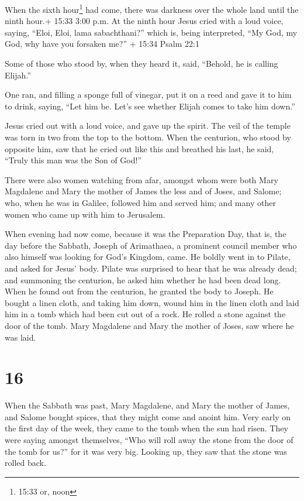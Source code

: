 When the sixth hour\footnote{15:33 or, noon} had come,
there was darkness over the whole land until the ninth hour.+ 15:33 3:00
p.m.  At the ninth hour Jesus cried with a loud voice,
saying, ``Eloi, Eloi, lama sabachthani?'' which is, being interpreted,
``My God, my God, why have you forsaken me?'' + 15:34 Psalm 22:1

 Some of those who stood by, when they heard it, said,
``Behold, he is calling Elijah.''

 One ran, and filling a sponge full of vinegar, put it on a
reed and gave it to him to drink, saying, ``Let him be. Let's see
whether Elijah comes to take him down.''

 Jesus cried out with a loud voice, and gave up the spirit.
 The veil of the temple was torn in two from the top to the
bottom.  When the centurion, who stood by opposite him, saw
that he cried out like this and breathed his last, he said, ``Truly this
man was the Son of God!''

 There were also women watching from afar, amongst whom
were both Mary Magdalene and Mary the mother of James the less and of
Joses, and Salome;  who, when he was in Galilee, followed
him and served him; and many other women who came up with him to
Jerusalem.

 When evening had now come, because it was the Preparation
Day, that is, the day before the Sabbath,  Joseph of
Arimathaea, a prominent council member who also himself was looking for
God's Kingdom, came. He boldly went in to Pilate, and asked for Jesus'
body.  Pilate was surprised to hear that he was already
dead; and summoning the centurion, he asked him whether he had been dead
long.  When he found out from the centurion, he granted the
body to Joseph.  He bought a linen cloth, and taking him
down, wound him in the linen cloth and laid him in a tomb which had been
cut out of a rock. He rolled a stone against the door of the tomb.
 Mary Magdalene and Mary the mother of Joses, saw where he
was laid.

\hypertarget{section-15}{%
\section{16}\label{section-15}}

 When the Sabbath was past, Mary Magdalene, and Mary the
mother of James, and Salome bought spices, that they might come and
anoint him.  Very early on the first day of the week, they
came to the tomb when the sun had risen.  They were saying
amongst themselves, ``Who will roll away the stone from the door of the
tomb for us?''  for it was very big. Looking up, they saw
that the stone was rolled back.

